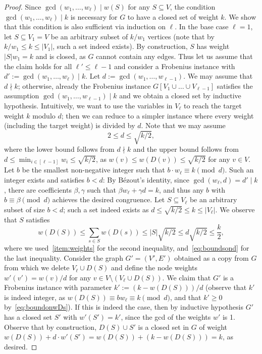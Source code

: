 \documentclass[10pt,a4paper]{article}
\theoremstyle{plain}
\newcommand{\divides}{\mid}
\newcommand{\notdivides}{\nmid}
\begin{document}
\begin{proof}
Since $\gcd(w_1,\dots, w_\ell) \divides w(S)$ for any $S\subseteq V$, the condition $\gcd(w_1,\dots,w_\ell) \divides k$ is necessary for $G$ to have a closed set of weight $k$.
%
We show that this condition is also sufficient via induction on $\ell$. In the base case $\ell=1$, let $S \subseteq V_1=V$ be an arbitrary subset of $k/w_1$ vertices (note that by $k/w_1 \le k \le |V_1|$, such a set indeed exists). By construction, $S$ has weight $|S|w_1 = k$ and is closed, as $G$ cannot contain any edges.
%
Thus let us assume that the claim holds for all $\ell' \le \ell - 1$ and consider a Frobenius instance with $d':=\gcd(w_1,\dots, w_\ell) \divides k$. Let $d := \gcd(w_1,\dots,w_{\ell-1})$. We may assume that $d \notdivides k$; otherwise, already the Frobenius instance $G[V_1 \cup \dots \cup V_{\ell-1}]$ satisfies the assumption $\gcd(w_1,\dots, w_{\ell-1})\divides k$ and we obtain a closed set by inductive hypothesis.
%
Intuitively, we want to use the variables in $V_\ell$ to reach the target weight $k$ modulo $d$; then we can reduce to a simpler instance where every weight (including the target weight) is divided by $d$.
Note that we may assume 
\begin{equation}\label{eq:boundsond}
 2 \le d \le \sqrt{k/2},
 \end{equation}
where the lower bound follows from $d\notdivides k$ and the upper bound follows from $d\le \min_{i\in [\ell-1]} w_i \le \sqrt{k/2}$, as $w(v) \le w(D(v)) \le \sqrt{k/2}$ for any $v\in V$.
%
Let $b$ be the smallest non-negative integer such that $b \cdot  w_\ell \equiv k \pmod d$. Such an integer exists and satisfies $b < d$: By B\'ezout's identity, since $\gcd(w_\ell, d) = d' \divides k$, there are coefficients $\beta, \gamma$ such that $\beta w_\ell + \gamma d = k$, and thus any $b$ with $b \equiv \beta \pmod d$ achieves the desired congruence. 
%
Let $S\subseteq V_\ell$ be an arbitrary subset of size $b< d$; such a set indeed exists as $d\le \sqrt{k/2} \le k \le |V_\ell|$. We observe that $S$ satisfies
\begin{equation}\label{eq:boundonwDs}
w(D(S)) \le \sum_{s \in S} w(D(s)) \le |S| \sqrt{k/2} \le d\sqrt{k/2} \le \frac{k}{2},
\end{equation}
where we used~\ref{item:weights} for the second inequality, and~\eqref{eq:boundsond} for the last inequality. 
Consider the graph $G' = (V', E')$ obtained as a copy from $G$ from which we delete $V_\ell \cup D(S)$ and define the node weights $w'(v') = w(v)/d$ for any $v\in V\setminus (V_\ell \cup D(S))$. We claim that $G'$ is a Frobenius instance with parameter $k' := (k-w(D(S)))/d$ (observe that $k'$ is indeed integer, as $w(D(S)) \equiv b w_\ell \equiv k \pmod d$, and that $k'\ge 0$ by~\eqref{eq:boundonwDs}). If this is indeed the case, then by inductive hypothesis $G'$ has a closed set $S'$ with $w'(S') = k'$, since the gcd of the weights $w'$ is 1. Observe that by construction, $D(S)\cup S'$ is a closed set in $G$ of weight $w(D(S)) + d \cdot w'(S') = w(D(S)) + (k-w(D(S))) = k$, as desired.

\end{proof}
\end{document}
